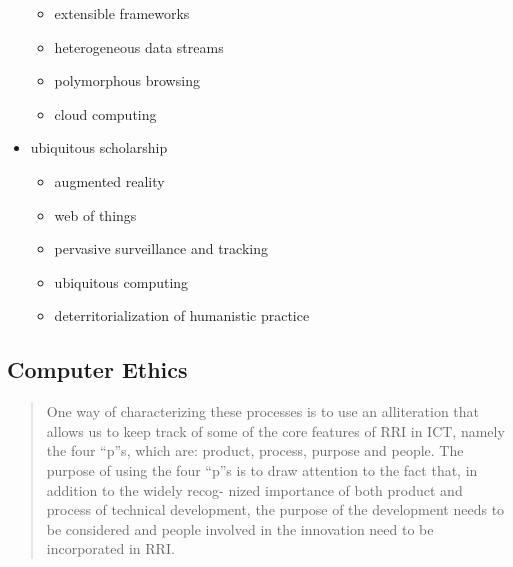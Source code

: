 \begin{itemize}
  \begin{itemize}
    \item extensible frameworks
    \item	heterogeneous data streams
    \item	polymorphous browsing
    \item	cloud computing
  \end{itemize}
  \item ubiquitous scholarship
  \begin{itemize}
    \item augmented reality
    \item	web of things
    \item	pervasive surveillance and tracking
    \item	ubiquitous computing
    \item	deterritorialization of humanistic practice
  \end{itemize}
\end{itemize}




\subsection*{Computer Ethics}


\begin{quote}
  One way of characterizing these processes is to use an alliteration that allows us to keep track of some of the core features of RRI in ICT, namely the four “p”s, which are: product, process, purpose and people. The purpose of using the four “p”s is to draw attention to the fact that, in addition to the widely recog- nized importance of both product and process of technical development, the purpose of the development needs to be considered and people involved in the innovation need to be incorporated in RRI. \autocite{Stahl2013}
\end{quote}

